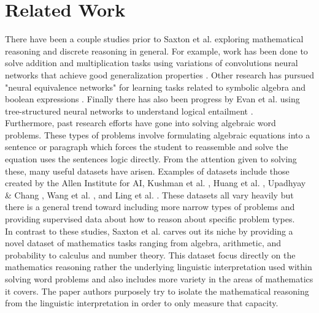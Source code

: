 \section{Related Work}

There have been a couple studies prior to Saxton et al. \supercite{DBLP:journals/corr/abs-1904-01557} exploring mathematical reasoning and discrete reasoning in general. For example, work has been done to solve addition and multiplication tasks using variations of convolutions neural networks that achieve good generalization properties \supercite{kaiser2015neural}. Other research has pursued "neural equivalence networks" for learning tasks related to symbolic algebra and boolean expressions \supercite{allamanis2017learning}. Finally there has also been progress by Evan et al. using tree-structured neural networks to understand logical entailment \supercite{evans2018neural}.   \\

Furthermore, past research efforts have gone into solving algebraic word problems. These types of problems involve formulating algebraic equations into a sentence or paragraph which forces the student to reassemble and solve the equation uses the sentences logic directly. From the attention given to solving these, many useful datasets have arisen. Examples of datasets include those created by the Allen Institute for AI, Kushman et al. \supercite{kushman2014learning}, Huang et al. \supercite{huang2016well},  Upadhyay \& Chang \supercite{upadhyay2016annotating}, Wang et al. \supercite{wang2017deep}, and Ling et al. \supercite{ling2017program}. These datasets all vary heavily but there is a general trend toward including more narrow types of problems and providing supervised data about how to reason about specific problem types.  \\


In contrast to these studies, Saxton et al. \supercite{DBLP:journals/corr/abs-1904-01557} carves out its niche by providing a novel dataset of mathematics tasks ranging from algebra, arithmetic, and probability to calculus and number theory. This dataset focus directly on the mathematics reasoning rather the underlying linguistic interpretation used within solving word problems and also includes more variety in the areas of mathematics it covers. The paper authors purposely try to isolate the mathematical reasoning from the linguistic interpretation in order to only measure that capacity. \\

